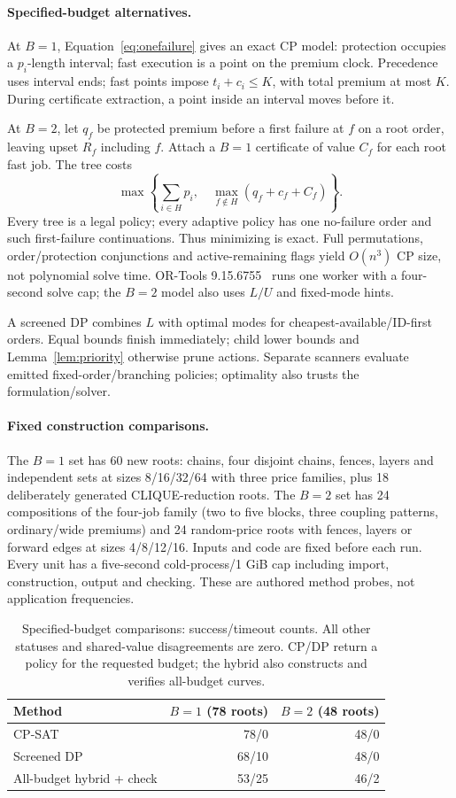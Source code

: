 \documentclass[acmsmall,screen,review,anonymous]{acmart}
\begin{document}
\paragraph{Specified-budget alternatives.}
At $B=1$, Equation~\eqref{eq:onefailure} gives an exact CP model: protection occupies a $p_i$-length interval; fast execution is a point on the premium clock. Precedence uses interval ends; fast points impose $t_i+c_i\le K$, with total premium at most $K$. During certificate extraction, a point inside an interval moves before it.

At $B=2$, let $q_f$ be protected premium before a first failure at $f$ on a root order, leaving upset $R_f$ including $f$. Attach a $B=1$ certificate of value $C_f$ for each root fast job. The tree costs
\[
 \max\left\{\sum_{i\in H}p_i,\quad\max_{f\notin H}(q_f+c_f+C_f)\right\}.
\]
Every tree is a legal policy; every adaptive policy has one no-failure order and such first-failure continuations. Thus minimizing is exact. Full permutations, order/protection conjunctions and active-remaining flags yield $O(n^3)$ CP size, not polynomial solve time. OR-Tools 9.15.6755~\cite{cpsat} runs one worker with a four-second solve cap; the $B=2$ model also uses $L/U$ and fixed-mode hints.

A screened DP combines $L$ with optimal modes for cheapest-available/ID-first orders. Equal bounds finish immediately; child lower bounds and Lemma~\ref{lem:priority} otherwise prune actions. Separate scanners evaluate emitted fixed-order/branching policies; optimality also trusts the formulation/solver.

\paragraph{Fixed construction comparisons.}
The $B=1$ set has 60 new roots: chains, four disjoint chains, fences, layers and independent sets at sizes 8/16/32/64 with three price families, plus 18 deliberately generated CLIQUE-reduction roots. The $B=2$ set has 24 compositions of the four-job family (two to five blocks, three coupling patterns, ordinary/wide premiums) and 24 random-price roots with fences, layers or forward edges at sizes 4/8/12/16. Inputs and code are fixed before each run. Every unit has a five-second cold-process/1 GiB cap including import, construction, output and checking. These are authored method probes, not application frequencies.

\begin{table}[t]
\caption{Specified-budget comparisons: success/timeout counts. All other statuses and shared-value disagreements are zero. CP/DP return a policy for the requested budget; the hybrid also constructs and verifies all-budget curves.}
\label{tab:specified}
\centering
\begin{tabular}{lrr}
\toprule
Method & $B=1$ (78 roots) & $B=2$ (48 roots)\\
\midrule
CP-SAT &78/0&48/0\\
Screened DP &68/10&48/0\\
All-budget hybrid + check &53/25&46/2\\
\bottomrule
\end{tabular}
\end{table}
\end{document}
